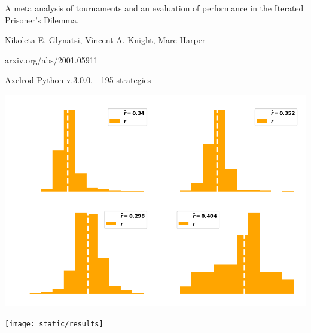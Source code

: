 \documentclass{beamer}
\begin{document}
\begin{frame}
    \centering
    A meta analysis of tournaments and an evaluation of performance in the Iterated Prisoner's Dilemma. \\
    \vspace{.5cm}

    \tiny{Nikoleta E. Glynatsi, Vincent A. Knight, Marc Harper} \\
    \vspace{.5cm}

    \tiny{arxiv.org/abs/2001.05911} \\
    \vspace{.8cm}

    \tiny{Axelrod-Python v.3.0.0. - 195 strategies}
\end{frame}

\begin{frame}
    \begin{center}
    
    \end{center}
\end{frame}

\begin{frame}
        \begin{center}
        \includegraphics[width=\textwidth]{static/tit_for_tat_r_distributions.png}
        \end{center}
    \end{frame}
    

\begin{frame}
    \begin{center}
    \texttt{[image: static/results]}
    \end{center}
\end{frame}
\end{document}
